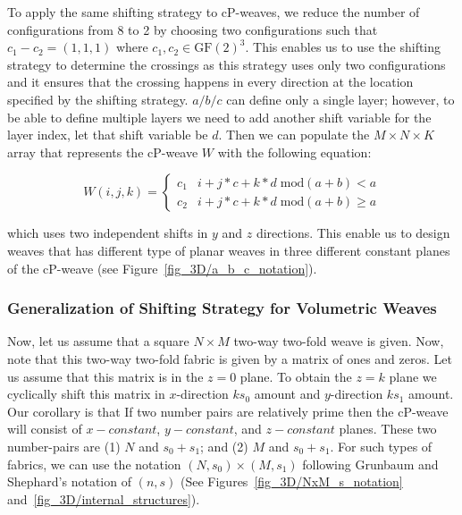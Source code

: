 \documentclass[unnumsec,webpdf,contemporary,large]{oup-authoring-template}%
\theoremstyle{thmstyleone}%
\theoremstyle{thmstyletwo}%
\theoremstyle{thmstylethree}%
\newcommand{\GF}{{\mathrm{GF}}}
\begin{document}
To apply the same shifting strategy to cP-weaves, we reduce the number of configurations from 8 to 2 by choosing two configurations such that $c_1-c_2=(1,1,1)$ where $c_1,c_2\in \GF(2)^3$. This enables us to use the shifting strategy to determine the crossings as this strategy uses only two configurations and it ensures that the crossing happens in every direction at the location specified by the shifting strategy. $a/b/c$ can define only a single layer; however, to be able to define multiple layers we need to add another shift variable for the layer index, let that shift variable be $d$. Then we can populate the $M\times N\times K$ array that represents the cP-weave $W$ with the following equation:

\begin{equation}
    W(i,j,k)=\begin{cases}
    c_1& i + j * c + k * d \;\text{mod} (a+b) < a\\
    c_2& i + j * c + k * d \;\text{mod} (a+b) \geq a
    \end{cases}
    \label{eq:abcd}
\end{equation}

which uses two independent shifts in $y$ and $z$ directions. This enable us to design weaves that has different type of planar weaves in three different constant planes of the cP-weave (see Figure~\ref{fig_3D/a_b_c_notation}). 

\subsubsection{Generalization of Shifting Strategy for Volumetric Weaves}
Now, let us assume that a square $N \times M$ two-way two-fold weave is given. %
Now, note that this two-way two-fold fabric is given by a matrix of ones and zeros. Let us assume that this matrix is in the $z=0$ plane. To obtain the $z=k$ plane we cyclically shift this matrix in $x$-direction $ks_0$ amount and $y$-direction $ks_1$ amount. Our corollary is that If two number pairs are relatively prime then the cP-weave will consist of $x-constant$, $y-constant$, and $z-constant$ planes. These two number-pairs are (1) $N$ and $s_0+s_1$; and (2) $M$ and $s_0+s_1$. For such types of fabrics, we can use the notation $(N,s_0) \times (M,s_1)$ following  Grunbaum and Shephard's notation of $(n,s)$ (See Figures~\ref{fig_3D/NxM_s_notation} and~\ref{fig_3D/internal_structures}). 
\end{document}
